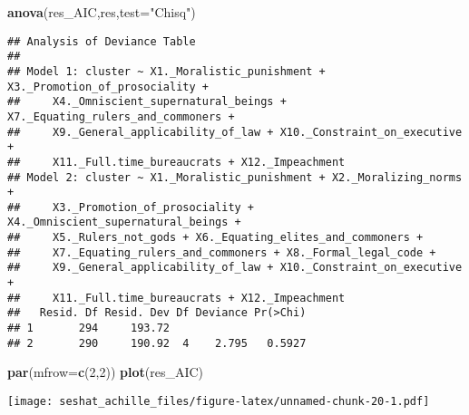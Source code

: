 \documentclass[
]{article}
\newenvironment{Shaded}{\begin{snugshade}}{\end{snugshade}}
\newcommand{\DataTypeTok}[1]{\textcolor[rgb]{0.13,0.29,0.53}{#1}}
\newcommand{\DecValTok}[1]{\textcolor[rgb]{0.00,0.00,0.81}{#1}}
\newcommand{\KeywordTok}[1]{\textcolor[rgb]{0.13,0.29,0.53}{\textbf{#1}}}
\newcommand{\NormalTok}[1]{#1}
\newcommand{\StringTok}[1]{\textcolor[rgb]{0.31,0.60,0.02}{#1}}
\begin{document}
\begin{Shaded}
\begin{Highlighting}[]
\KeywordTok{anova}\NormalTok{(res_AIC,res,}\DataTypeTok{test=}\StringTok{"Chisq"}\NormalTok{)}
\end{Highlighting}
\end{Shaded}

\begin{verbatim}
## Analysis of Deviance Table
## 
## Model 1: cluster ~ X1._Moralistic_punishment + X3._Promotion_of_prosociality + 
##     X4._Omniscient_supernatural_beings + X7._Equating_rulers_and_commoners + 
##     X9._General_applicability_of_law + X10._Constraint_on_executive + 
##     X11._Full.time_bureaucrats + X12._Impeachment
## Model 2: cluster ~ X1._Moralistic_punishment + X2._Moralizing_norms + 
##     X3._Promotion_of_prosociality + X4._Omniscient_supernatural_beings + 
##     X5._Rulers_not_gods + X6._Equating_elites_and_commoners + 
##     X7._Equating_rulers_and_commoners + X8._Formal_legal_code + 
##     X9._General_applicability_of_law + X10._Constraint_on_executive + 
##     X11._Full.time_bureaucrats + X12._Impeachment
##   Resid. Df Resid. Dev Df Deviance Pr(>Chi)
## 1       294     193.72                     
## 2       290     190.92  4    2.795   0.5927
\end{verbatim}

\begin{Shaded}
\begin{Highlighting}[]
\KeywordTok{par}\NormalTok{(}\DataTypeTok{mfrow=}\KeywordTok{c}\NormalTok{(}\DecValTok{2}\NormalTok{,}\DecValTok{2}\NormalTok{))}
\KeywordTok{plot}\NormalTok{(res_AIC)}
\end{Highlighting}
\end{Shaded}

\texttt{[image: seshat\_achille\_files/figure-latex/unnamed-chunk-20-1.pdf]}
\end{document}

